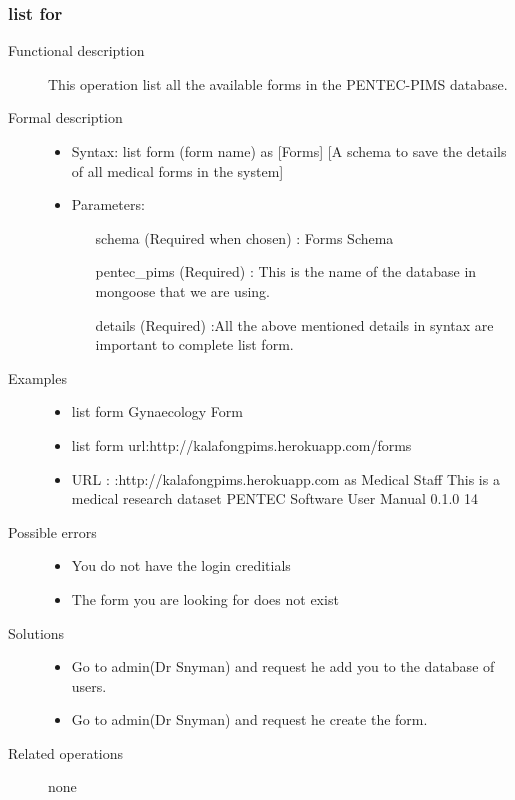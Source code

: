 \documentclass[14pt, a4paper]{article}
\begin{document}
\subsubsection{list for}
\begin{description}
\item[Functional description] This operation list all the available forms in the PENTEC-PIMS database.
\item[Formal description]\hfill
\begin{itemize}
	\item Syntax: list form (form name) as [Forms] [A schema to save the details of all medical forms in the system]\\
	\item Parameters:
	\begin{itemize}
		\item [schema] (Required when chosen) : Forms Schema
		\item [pentec\_pims] (Required) : This is the name of the database in mongoose that we are using.
		\item [details] (Required) :All the above mentioned details in syntax are important to complete list form.
	\end{itemize}
\end{itemize}

\item[Examples]\hfill
\begin{itemize}
	\item list form Gynaecology Form
	\item list form url:http://kalafongpims.herokuapp.com/forms
	\item URL : :http://kalafongpims.herokuapp.com as Medical Staff This is a medical research dataset
	PENTEC Software User Manual 0.1.0 14
\end{itemize}

\item[Possible errors]\hfill
\begin{itemize}
	\item You do not have the login creditials
	\item The form you are looking for does not exist
\end{itemize}

\item[Solutions]\hfill
\begin{itemize}
	\item Go to admin(Dr Snyman) and request he add you to the database of users.
	\item Go to admin(Dr Snyman) and request he create the form.
\end{itemize}
\item[Related operations] none

\end{description}
	      	      
\end{document}
